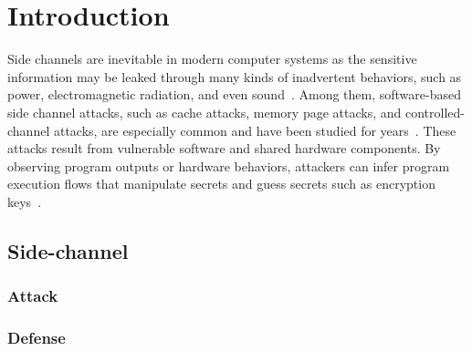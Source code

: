 
\chapter{Introduction} \label{chapter1:introduction}

Side channels are inevitable in modern computer systems as the sensitive
information may be leaked through many kinds of inadvertent behaviors, such as power,
electromagnetic radiation, and even
sound~\cite{agrawal2002side,kar20178,chari1999towards,217605,genkin2014rsa}.
Among them, software-based side channel attacks, such as cache attacks, memory page
attacks, and controlled-channel attacks, are especially common and have been
studied for
years~\cite{7163052,217543,217589,lee2017inferring,191010,liu2015last}. These
attacks result from vulnerable software and shared hardware components.
By observing program outputs or hardware behaviors, attackers can infer program
execution flows that manipulate secrets and guess secrets such as encryption
keys~\cite{Osvik2006,Gullasch:2011:CGB:2006077.2006784,203878,10.1007/978-3-540-45238-6_6}.


\section{Side-channel}

\subsection{Attack}

\subsection{Defense}

